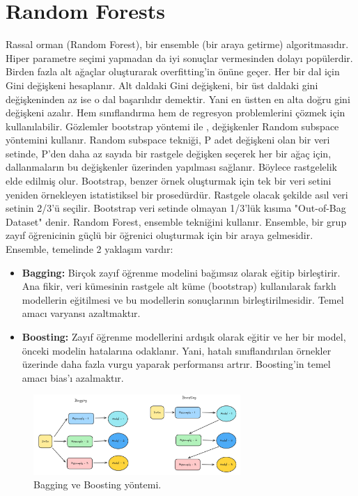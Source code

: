 \section{Random Forests}
Rassal orman (Random Forest), bir ensemble (bir araya getirme) algoritmasıdır. Hiper parametre seçimi yapmadan da iyi sonuçlar vermesinden dolayı popülerdir. Birden fazla alt ağaçlar oluşturarak overfitting'in önüne geçer. Her bir dal için Gini değişkeni hesaplanır. Alt daldaki Gini değişkeni, bir üst daldaki gini değişkeninden az ise o dal başarılıdır demektir. Yani en üstten en alta doğru gini değişkeni azalır. Hem sınıflandırma hem de regresyon problemlerini çözmek için kullanılabilir. Gözlemler bootstrap yöntemi ile , değişkenler Random subspace yöntemini kullanır. Random subspace tekniği, P adet değişkeni olan bir veri setinde, P'den daha az sayıda bir rastgele değişken seçerek her bir ağaç için, dallanmaların bu değişkenler üzerinden yapılması sağlanır. Böylece rastgelelik elde edilmiş olur. Bootstrap, benzer örnek oluşturmak için tek bir veri setini yeniden örnekleyen istatistiksel bir prosedürdür. Rastgele olacak şekilde asıl veri setinin 2/3'ü seçilir. Bootstrap veri setinde olmayan 1/3'lük kısıma "Out-of-Bag Dataset" denir. Random Forest, ensemble tekniğini kullanır. Ensemble, bir grup zayıf öğrenicinin güçlü bir öğrenici oluşturmak için bir araya gelmesidir. Ensemble, temelinde 2 yaklaşım vardır:

\begin{itemize}
    \item \textbf{Bagging:} Birçok zayıf öğrenme modelini bağımsız olarak eğitip birleştirir. Ana fikir, veri kümesinin rastgele alt küme (bootstrap) kullanılarak farklı modellerin eğitilmesi ve bu modellerin sonuçlarının birleştirilmesidir. Temel amacı varyansı azaltmaktır.
    \item \textbf{Boosting:} Zayıf öğrenme modellerini ardışık olarak eğitir ve her bir model, önceki modelin hatalarına odaklanır. Yani, hatalı sınıflandırılan örnekler üzerinde daha fazla vurgu yaparak performansı artrır. Boosting'in temel amacı bias'ı azalmaktır.
\end{itemize}

\begin{figure}[h]
    \centering
    \includegraphics[width=0.7\textwidth]{images/bagging_vs_boosting.png}
    \caption{Bagging ve Boosting yöntemi.}
    \label{fig:enter-label}
\end{figure}

